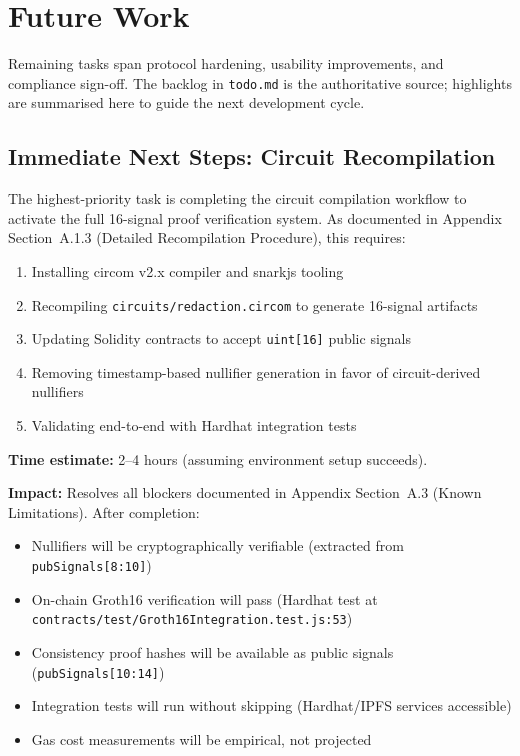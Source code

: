 \section{Future Work}

Remaining tasks span protocol hardening, usability improvements, and compliance sign-off. The backlog in \texttt{todo.md} is the authoritative source; highlights are summarised here to guide the next development cycle.

\subsection{Immediate Next Steps: Circuit Recompilation}

The highest-priority task is completing the circuit compilation workflow to activate the full 16-signal proof verification system. As documented in Appendix Section~A.1.3 (Detailed Recompilation Procedure), this requires:

\begin{enumerate}
    \item Installing circom v2.x compiler and snarkjs tooling
    \item Recompiling \texttt{circuits/redaction.circom} to generate 16-signal artifacts
    \item Updating Solidity contracts to accept \texttt{uint[16]} public signals
    \item Removing timestamp-based nullifier generation in favor of circuit-derived nullifiers
    \item Validating end-to-end with Hardhat integration tests
\end{enumerate}

\textbf{Time estimate:} 2--4 hours (assuming environment setup succeeds).

\textbf{Impact:} Resolves all blockers documented in Appendix Section~A.3 (Known Limitations). After completion:
\begin{itemize}
    \item Nullifiers will be cryptographically verifiable (extracted from \texttt{pubSignals[8:10]})
    \item On-chain Groth16 verification will pass (Hardhat test at \texttt{contracts/test/Groth16Integration.test.js:53})
    \item Consistency proof hashes will be available as public signals (\texttt{pubSignals[10:14]})
    \item Integration tests will run without skipping (Hardhat/IPFS services accessible)
    \item Gas cost measurements will be empirical, not projected
\end{itemize}

